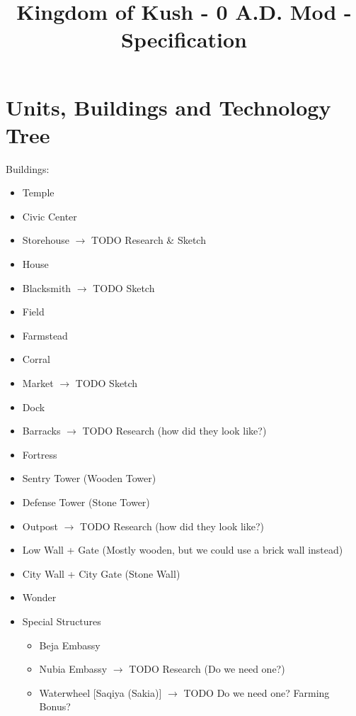 \documentclass[a4paper,12pt]{scrreprt}
\title{Kingdom of Kush - 0 A.D. Mod - Specification}
\begin{document}
\maketitle


\tableofcontents

\chapter{Units, Buildings and Technology Tree}

Buildings:

\begin{itemize}
	\item Temple
	\item Civic Center
	\item Storehouse $\rightarrow$ TODO Research \& Sketch
	\item House
	\item Blacksmith $\rightarrow$ TODO Sketch
	\item Field
	\item Farmstead
	\item Corral
	\item Market $\rightarrow$ TODO Sketch
	\item Dock
	\item Barracks $\rightarrow$ TODO Research (how did they look like?)
	\item Fortress
	\item Sentry Tower (Wooden Tower)
	\item Defense Tower (Stone Tower)
	\item Outpost $\rightarrow$ TODO Research (how did they look like?)
	\item Low Wall + Gate (Mostly wooden, but we could use a brick wall instead)
	\item City Wall + City Gate (Stone Wall)
	\item Wonder
	\item Special Structures
	\begin{itemize}
		\item Beja Embassy  
		
		\item Nubia Embassy $\rightarrow$ TODO Research (Do we need one?)
		\item Waterwheel [Saqiya (Sakia)] $\rightarrow$ TODO Do we need one? Farming Bonus?
	\end{itemize}
\end{itemize}
\end{document}
